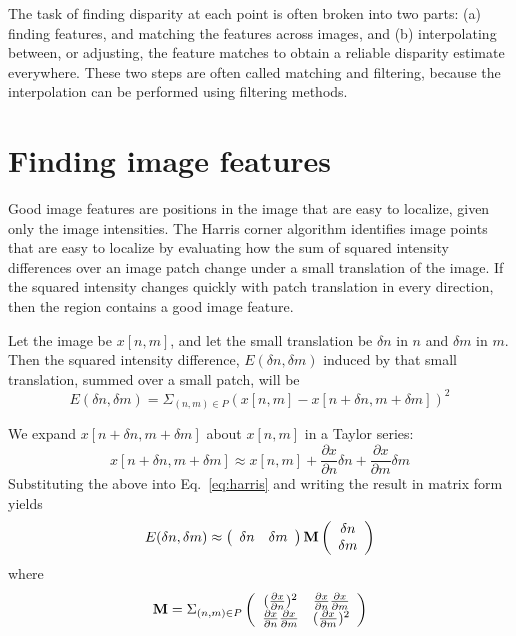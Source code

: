 The task of finding disparity at each point is often broken into two parts:  (a) finding features, and matching the features across images, and (b) interpolating between, or adjusting, the feature matches to obtain a reliable disparity estimate everywhere.
These two steps are often called matching and filtering, because the interpolation can be performed using filtering methods.



\section{Finding image features}
Good image features are positions in the image that are easy to localize, given only the image intensities. The Harris corner \cite{Harris88} algorithm identifies image points that are easy to localize by evaluating how the sum of squared intensity differences over an image patch change under a small translation of the image. If the squared intensity changes quickly with patch translation in every direction, then the region contains a good image feature.

Let the image be $x[n,m]$, and let the small translation be $\delta n$ in $n$ and $\delta m$ in $m$.  Then the squared intensity difference, $E(\delta n, \delta m)$ induced by that small translation, summed over a small patch, will be
\begin{equation}
    E(\delta n, \delta m) = \Sigma_{(n, m) \in P}
    (x[n,m] - x[n + \delta n, m + \delta m])^2
    \label{eq:harris}
\end{equation}

We expand $x[n + \delta n, m + \delta m]$ about $x[n, m]$ in a Taylor series:
\begin{equation}
    x[n + \delta n, m + \delta m] \approx
    x[n, m] + \frac{\partial x}{\partial n} \delta n
    + \frac{\partial x}{\partial m} \delta m
\end{equation}
Substituting the above into Eq.~\ref{eq:harris} and writing the result in matrix form yields
\begin{equation}
    E(\delta n, \delta m) \approx
    \left( \begin{array}{c c}
            \delta n & \delta m
        \end{array}
    \right)
    \mathbf{M}
    \left( \begin{array}{c}
            \delta n \\
            \delta m
        \end{array}
    \right)
\end{equation}
where
\begin{equation}
    \mathbf{M} = \Sigma_{(n, m) \in P}
    \left( \begin{array}{c c}
            (\frac{\partial x}{\partial n})^2 &
            \frac{\partial x}{\partial n}
            \frac{\partial x}{\partial m}                                         \\
            \frac{\partial x}{\partial n}
            \frac{\partial x}{\partial m}
                                              & (\frac{\partial x}{\partial m})^2
        \end{array} \right)
\end{equation}

